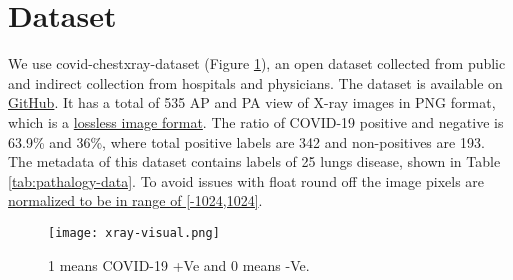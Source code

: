 \documentclass[a4paper]{article}
\begin{document}
\section{Dataset}

We use covid-chestxray-dataset \cite{cohen2020covid} (Figure \ref{fig:xray-visual}), an open dataset collected from public and indirect collection from hospitals and physicians. The dataset is available on \href{https://github.com/ieee8023/covid-chestxray-dataset}{GitHub}.
It has a total of 535 AP and PA view of X-ray images in PNG format, which is a \href{https://guides.lib.umich.edu/c.php?g=282942&p=1885348#:~:text=PNG\%20(.&text=PNG\%20or\%20Portable\%20Network\%20Graphics,256\%20colors\%20supported\%20by\%20GIF.}{lossless image format}.
The ratio of COVID-19 positive and negative is 63.9\% and 36\%, where total positive labels are 342 and non-positives are 193. The metadata of this dataset contains labels of 25 lungs disease, shown in Table \ref{tab:pathalogy-data}.
To avoid issues with float round off the image pixels are \href{https://github.com/mlmed/torchxrayvision/issues/9}{normalized to be in range of [-1024,1024]}.


\begin{figure}[h]
\centering
\texttt{[image: xray-visual.png]}
\caption{\label{fig:xray-visual}1 means COVID-19 +Ve and 0 means -Ve.}
\end{figure}
\end{document}
